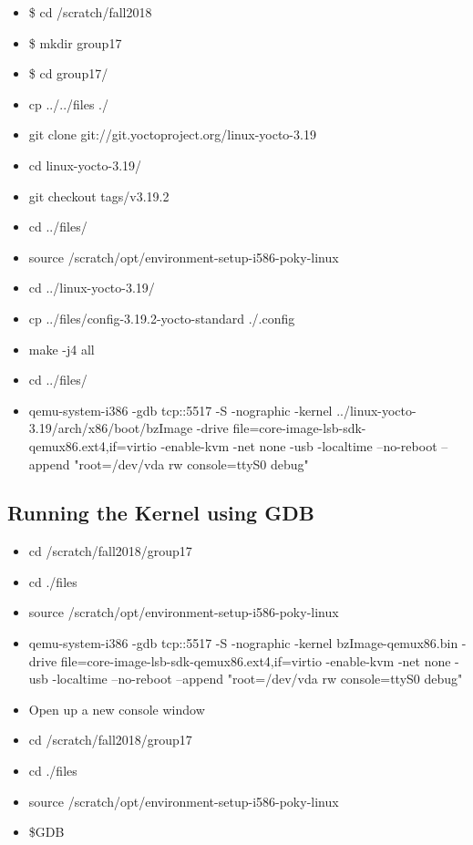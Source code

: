 \documentclass{article}
\begin{document}
\begin{itemize}
    \item \$ cd /scratch/fall2018
    \item \$ mkdir group17
    \item \$ cd group17/
    \item cp ../../files ./
    \item git clone git://git.yoctoproject.org/linux-yocto-3.19
\item cd linux-yocto-3.19/
\item git checkout tags/v3.19.2
\item cd ../files/
\item source /scratch/opt/environment-setup-i586-poky-linux
\item cd ../linux-yocto-3.19/
\item cp ../files/config-3.19.2-yocto-standard ./.config
\item make -j4 all
\item cd ../files/
\item qemu-system-i386 -gdb tcp::5517 -S -nographic -kernel ../linux-yocto-3.19/arch/x86/boot/bzImage -drive file=core-image-lsb-sdk-qemux86.ext4,if=virtio -enable-kvm -net none -usb -localtime --no-reboot --append "root=/dev/vda rw console=ttyS0 debug"
\end{itemize}

\subsection{Running the Kernel using GDB}

\begin{itemize}
\item cd /scratch/fall2018/group17
\item cd ./files
\item source /scratch/opt/environment-setup-i586-poky-linux
\item qemu-system-i386 -gdb tcp::5517 -S -nographic -kernel bzImage-qemux86.bin -drive file=core-image-lsb-sdk-qemux86.ext4,if=virtio -enable-kvm -net none -usb -localtime --no-reboot --append "root=/dev/vda rw console=ttyS0 debug"
\item Open up a new console window
\item cd /scratch/fall2018/group17
\item cd ./files
\item source /scratch/opt/environment-setup-i586-poky-linux
\item \$GDB
\end{itemize}
\end{document}
